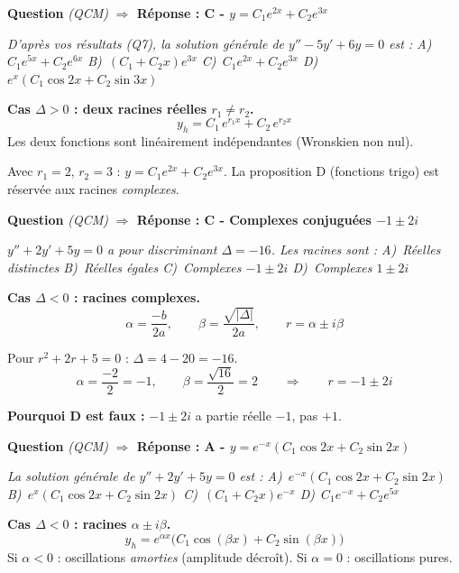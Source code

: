 \documentclass[11pt,a4paper]{article}
\newcounter{qnum}
\newcommand{\qtitre}[2]{%
  \stepcounter{qnum}%
  \medskip\noindent
  \textbf{\color{bleutexte}Question \theqnum}\enspace
  \textit{(#1)}\enspace
  \textcolor{vertok}{\textbf{$\Rightarrow$ Réponse : #2}}
  \par\smallskip
}
\newcommand{\qenonce}[1]{%
  \begin{mdframed}[backgroundcolor=grisbox, linewidth=0pt,
    innerleftmargin=8pt, innerrightmargin=8pt,
    innertopmargin=5pt, innerbottommargin=5pt,
    skipabove=2pt, skipbelow=4pt]
  \small\textit{#1}
  \end{mdframed}
}
\begin{document}
\qtitre{QCM}{C - $y = C_1e^{2x} + C_2e^{3x}$}
\qenonce{D'après vos résultats (Q7), la solution générale de $y'' - 5y' + 6y = 0$ est :
\quad A)~$C_1e^{5x}+C_2e^{6x}$ \quad B)~$(C_1+C_2x)e^{3x}$ \quad C)~$C_1e^{2x}+C_2e^{3x}$ \quad D)~$e^x(C_1\cos2x+C_2\sin3x)$}

\begin{methodebox}
\textbf{Cas $\Delta > 0$ : deux racines réelles $r_1 \neq r_2$.}
$$y_h = C_1\,e^{r_1 x} + C_2\,e^{r_2 x}$$
Les deux fonctions sont linéairement indépendantes (Wronskien non nul).
\end{methodebox}

Avec $r_1 = 2$, $r_2 = 3$ : $y = C_1e^{2x} + C_2e^{3x}$. La proposition D (fonctions trigo) est réservée aux racines \emph{complexes}.

\qtitre{QCM}{C - Complexes conjuguées $-1 \pm 2i$}
\qenonce{$y'' + 2y' + 5y = 0$ a pour discriminant $\Delta = -16$. Les racines sont :
\quad A)~Réelles distinctes \quad B)~Réelles égales \quad C)~Complexes $-1\pm 2i$ \quad D)~Complexes $1\pm 2i$}

\begin{methodebox}
\textbf{Cas $\Delta < 0$ : racines complexes.}
$$\alpha = \frac{-b}{2a},\qquad \beta = \frac{\sqrt{|\Delta|}}{2a},\qquad r = \alpha \pm i\beta$$
\end{methodebox}

Pour $r^2 + 2r + 5 = 0$ : $\Delta = 4 - 20 = -16$.
$$\alpha = \frac{-2}{2} = -1,\qquad \beta = \frac{\sqrt{16}}{2} = 2 \qquad\Rightarrow\qquad \boxed{r = -1 \pm 2i}$$

\textbf{Pourquoi D est faux :} $-1 \pm 2i$ a partie réelle $-1$, pas $+1$.

\qtitre{QCM}{A - $y = e^{-x}(C_1\cos 2x + C_2\sin 2x)$}
\qenonce{La solution générale de $y'' + 2y' + 5y = 0$ est :
\quad A)~$e^{-x}(C_1\cos2x+C_2\sin2x)$ \quad B)~$e^{x}(C_1\cos2x+C_2\sin2x)$ \quad C)~$(C_1+C_2x)e^{-x}$ \quad D)~$C_1e^{-x}+C_2e^{5x}$}

\begin{methodebox}
\textbf{Cas $\Delta < 0$ : racines $\alpha \pm i\beta$.}
$$y_h = e^{\alpha x}\bigl(C_1\cos(\beta x) + C_2\sin(\beta x)\bigr)$$
Si $\alpha < 0$ : oscillations \emph{amorties} (amplitude décroît). Si $\alpha = 0$ : oscillations pures.
\end{methodebox}
\end{document}
